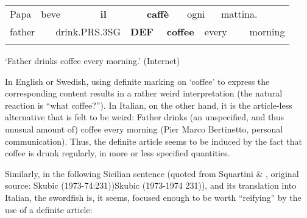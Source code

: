 \begin{tabular}{llllllllllll}
\lsptoprule
Papa & \multicolumn{2}{l}{beve

} & \multicolumn{2}{l}{{\bfseries il}

} & \multicolumn{2}{l}{{\bfseries caffè}

} & \multicolumn{2}{l}{ogni

} & \multicolumn{2}{l}{mattina.

} & \\
\multicolumn{2}{l}{father

} & \multicolumn{2}{l}{drink.PRS.3SG

} & \multicolumn{2}{l}{{\bfseries DEF}

} & \multicolumn{2}{l}{{\bfseries coffee}

} & \multicolumn{2}{l}{every

} & \multicolumn{2}{l}{morning

}\\
\lspbottomrule
\end{tabular}

\begin{styleTranslation}
‘Father drinks coffee every morning.’ (Internet)

\end{styleTranslation}

\begin{styleBodyTextFirst}
In English or Swedish, using definite marking on ‘coffee’ to express the corresponding content results in a rather weird interpretation (the natural reaction is “what coffee?”). In Italian, on the other hand, it is the article-less alternative that is felt to be weird: Father drinks (an unspecified, and thus unusual amount of) coffee every morning (Pier Marco Bertinetto, personal communication). Thus, the definite article seems to be induced by the fact that coffee is drunk regularly, in more or less specified quantities. 

\end{styleBodyTextFirst}

\begin{styleBodytextC}
Similarly, in the following Sicilian sentence (quoted from Squartini \& \citet[413]{Bertinetto2000}, original source: Skubic (1973-74:231))Skubic (1973-1974 231)), and its translation into Italian, the swordfish is, it seems, focused enough to be worth “reifying” by the use of a definite article:

\end{styleBodytextC}

